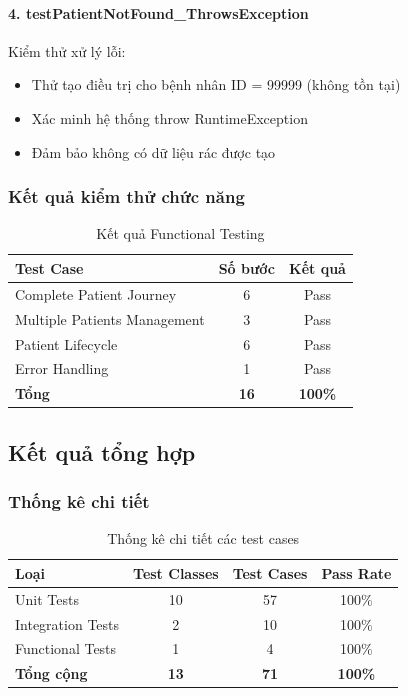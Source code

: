 \paragraph{4. testPatientNotFound\_ThrowsException}

Kiểm thử xử lý lỗi:

\begin{itemize}
    \item Thử tạo điều trị cho bệnh nhân ID = 99999 (không tồn tại)
    \item Xác minh hệ thống throw RuntimeException
    \item Đảm bảo không có dữ liệu rác được tạo
\end{itemize}

\subsubsection{Kết quả kiểm thử chức năng}

\begin{table}[h]
\centering
\caption{Kết quả Functional Testing}
\label{tab:functional-testing}
\begin{tabular}{|l|c|c|}
\hline
\textbf{Test Case} & \textbf{Số bước} & \textbf{Kết quả} \\
\hline
Complete Patient Journey & 6 & Pass \\
Multiple Patients Management & 3 & Pass \\
Patient Lifecycle & 6 & Pass \\
Error Handling & 1 & Pass \\
\hline
\textbf{Tổng} & \textbf{16} & \textbf{100\%} \\
\hline
\end{tabular}
\end{table}

\subsection{Kết quả tổng hợp}

\subsubsection{Thống kê chi tiết}

\begin{table}[h]
\centering
\caption{Thống kê chi tiết các test cases}
\label{tab:detailed-stats}
\begin{tabular}{|l|c|c|c|}
\hline
\textbf{Loại} & \textbf{Test Classes} & \textbf{Test Cases} & \textbf{Pass Rate} \\
\hline
Unit Tests & 10 & 57 & 100\% \\
Integration Tests & 2 & 10 & 100\% \\
Functional Tests & 1 & 4 & 100\% \\
\hline
\textbf{Tổng cộng} & \textbf{13} & \textbf{71} & \textbf{100\%} \\
\hline
\end{tabular}
\end{table}

